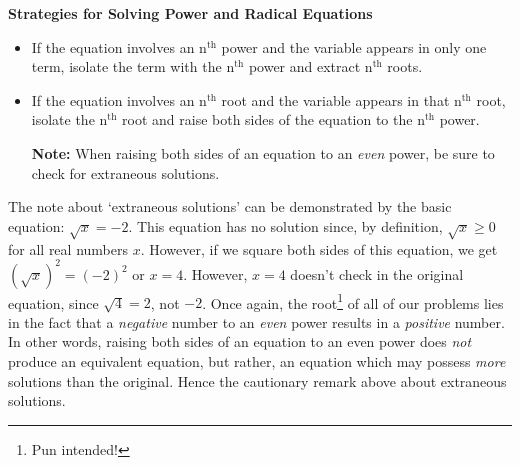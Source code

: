 \colorbox{ResultColor}{\bbm
\begin{boxinfo}
\centerline{\textbf{Strategies for Solving Power and Radical Equations}}

\begin{itemize}

\item  If the equation involves an $\text{n}^{\text{th}}$ power and the variable appears in only one term, isolate the term with the $\text{n}^{\text{th}}$ power and extract $\text{n}^{\text{th}}$ roots.

\item  If the equation involves an $\text{n}^{\text{th}}$ root and the variable appears in that $\text{n}^{\text{th}}$ root, isolate the $\text{n}^{\text{th}}$ root and raise both sides of the equation to the $\text{n}^{\text{th}}$ power.

\textbf{Note:}  When raising both sides of an equation to an \textit{even} power, be sure to check for extraneous solutions.

\end{itemize}
\end{boxinfo}
\ebm}

\medskip

The note about `extraneous solutions' can be demonstrated by the basic equation: $\sqrt{x} = -2$.  This equation has no solution since, by definition, $\sqrt{x} \geq 0$ for all real numbers $x$.  However, if we square both sides of this equation, we get $(\sqrt{x})^2 = (-2)^2$ or $x = 4$.  However, $x = 4$ doesn't check in the original equation, since $\sqrt{4} = 2$, not $-2$.  Once again, the root\footnote{Pun intended!} of all of our problems lies in the fact that a \textit{negative} number to an \textit{even} power results in a \textit{positive} number. In other words, raising both sides of an equation to an even power does \textit{not} produce an equivalent equation, but rather, an equation which may possess \textit{more} solutions than the original.  Hence the cautionary remark above about extraneous solutions.

